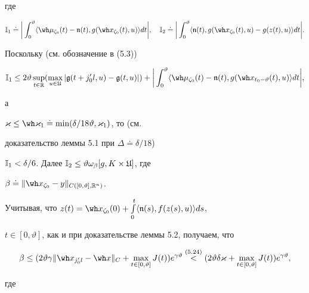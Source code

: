 где


$$


\Bbb I_1\doteq\bigg|\int_0^\vartheta\langle\wh\mu_{\zeta_0}(t)-


\frak n(t),g(\wh x_{\zeta_0}(t),u)\rangle dt\bigg|,\quad


\Bbb I_2\doteq\bigg|\int_0^\vartheta


\langle\frak n(t),g(\wh x_{\zeta_0}(t),u)- g(z(t),u)\rangle dt\bigg|.


$$





Поскольку (см. обозначение в (5.3))


$$


\Bbb I_1\le2\vartheta


\sup_{t\in\bR}(\max_{u\in\frak U}


|\frak g(t+j'_0l,u)-\frak g(t,u)|)+\bigg|\int_0^\vartheta


\langle\wh\mu_{\zeta_0}(t)-{\frak n}(t),


g(\wh x_{t_0-\vartheta }(t),u)\rangle dt\bigg|,


$$


а


$\varkappa\le\wh\varkappa_1\doteq


\min(\delta/18\vartheta,\varkappa_1)$, то (см.


доказательство леммы 5.1 при $\Delta\doteq\delta/18$)


$\Bbb I_1<\delta/6$. Далее $\Bbb I_2\le\vartheta


\omega_\beta[g,K\times\frak U]$, где


$\beta\doteq\|\wh x_{\zeta_0}-y\|_{C([0,\vartheta],\bR^n)}$.


Учитывая, что $z(t)=\wh x_{\zeta_0}(0)+


\int\limits_0^t\langle\frak n(s),f(z(s),u)\rangle ds$,


$t\in[0,\vartheta ]$, как и при доказательстве леммы 5.2, получаем, что


$$


\beta\le(2\vartheta\gamma\|\wh x_{j'_0l}-\wh x\|_C+


\max_{t\in[0,\vartheta ]}J(t))


e^{\gamma\vartheta}\up{(5.24)}{<}


(2\vartheta\delta\varkappa+\max_{t\in[0,\vartheta]}


J(t))e^{\gamma\vartheta},


$$


где


